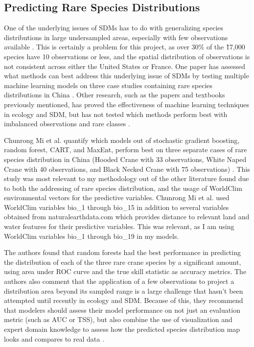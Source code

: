 \documentclass[12pt, oneside]{article}
\begin{document}
\begin{normalsize}
\subsection{Predicting Rare Species Distributions}

One of the underlying issues of SDMs has to do with generalizing species distributions in large undersampled areas, especially with few observations available \cite{mi2017choose}. This is certainly a problem for this project, as over 30\% of the \~17,000 species have 10 observations or less, and the spatial distribution of observations is not consistent across either the United States or France. One paper has assessed what methods can best address this underlying issue of SDMs by testing multiple machine learning models on three case studies containing rare species distributions in China \cite{mi2017choose}. Other research, such as the papers and textbooks previously mentioned, has proved the effectiveness of machine learning techniques in ecology and SDM, but has not tested which methods perform best with imbalanced observations and rare classes \cite{cutler2007random}.

Chunrong Mi et al. quantify which models out of stochastic gradient boosting, random forest, CART, and MaxEnt, perform best on three separate cases of rare species distribution in China (Hooded Crane with 33 observations, White Naped Crane with 40 observations, and Black Necked Crane with 75 observations) \cite{mi2017choose}. This study was most relevant to my methodology out of the other literature found due to both the addressing of rare species distribution, and the usage of WorldClim environmental vectors for the predictive variables. Chunrong Mi et al. used WorldClim variables bio\_1 through bio\_15 in addition to several variables obtained from naturalearthdata.com which provides distance to relevant land and water features for their predictive variables. This was relevant, as I am using WorldClim variables bio\_1 through bio\_19 in my models.

The authors found that random forests had the best performance in predicting the distribution of each of the three rare crane species by a significant amount, using area under ROC curve and the true skill statistic as accuracy metrics. The authors also comment that the application of a few observations to project a distribution area beyond its sampled range is a large challenge that hasn't been attempted until recently in ecology and SDM. Because of this, they recommend that modelers should assess their model performance on not just an evaluation metric (such as AUC or TSS), but also combine the use of visualization and expert domain knowledge to assess how the predicted species distribution map looks and compares to real data \cite{mi2017choose}.

\end{normalsize}
\end{document}
